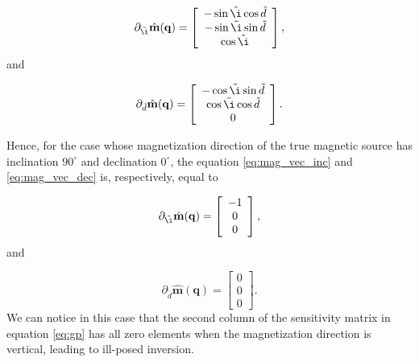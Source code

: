 \begin{equation}
	 \partial_{\tilde{\i}} \hat{\mathbf{m}}(\mathbf{q}) =
	\left[ \begin{array}{c}
		-\sin \tilde{\i} \cos \tilde{d} \\
		-\sin \tilde{\i} \sin \tilde{d}\\
		 \cos \tilde{\i}
	\end{array} \right], 
	\label{eq:mag_vec_inc}
\end{equation}
and 

\begin{equation}
	 \partial_{\tilde{d}} \hat{\mathbf{m}}(\mathbf{q}) =
	\left[ \begin{array}{c}
		-\cos \tilde{\i} \sin \tilde{d} \\
		\cos \tilde{\i} \cos \tilde{d}\\
		0
	\end{array} \right]. 
	\label{eq:mag_vec_dec}
\end{equation}

Hence, for the case whose magnetization direction of the true magnetic source has inclination $90^\circ$ and declination $0^\circ$, the equation \ref{eq:mag_vec_inc} and \ref{eq:mag_vec_dec} is, respectively, equal to 

 
\begin{equation}
\partial_{\tilde{\i}} \hat{\mathbf{m}}(\mathbf{q}) =
	\left[ \begin{array}{c}
		-1 \\
		 0 \\
		 0
	\end{array} \right], 
	\label{eq:mag_vec_inc_90}
\end{equation}
and 

\begin{equation}
	\partial_{\tilde{d}} \hat{\mathbf{m}}(\mathbf{q}) =
	\left[ \begin{array}{c}
		0 \\
		0 \\
		0
	\end{array} \right]. 
	\label{eq:mag_vec_dec_0}
\end{equation}
We can notice in this case that the second column of the sensitivity matrix in equation \ref{eq:gp} has all zero elements when the magnetization direction is vertical, leading to ill-posed inversion.

           



